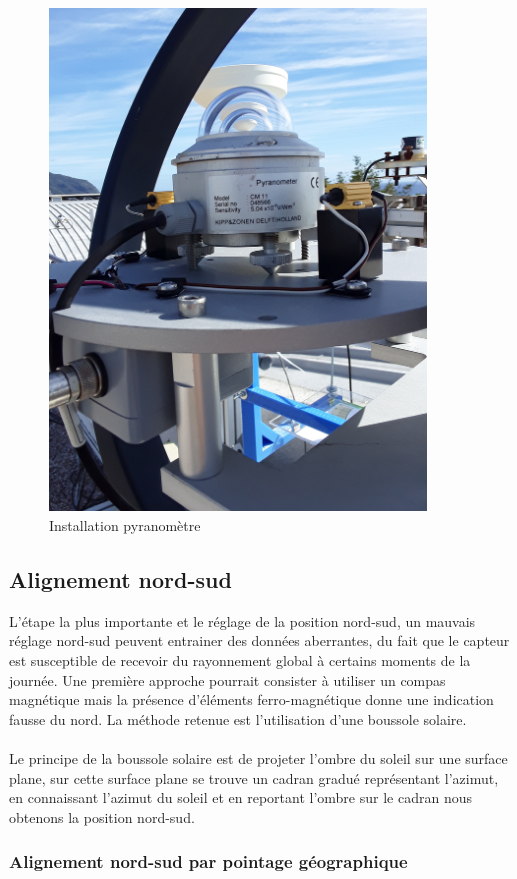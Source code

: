 \documentclass[12pt,a4paper]{article}
\begin{document}
\begin{flushleft}
\begin{figure}[H]
\centering
\includegraphics[width=10cm, angle=-90]{image/montage/4.jpg} 
\caption{Installation pyranomètre}
\end{figure}

\subsection{Alignement nord-sud}
L'étape la plus importante et le réglage de la position nord-sud, un mauvais réglage nord-sud peuvent entrainer des données aberrantes, du fait que le capteur est susceptible de recevoir du rayonnement global à certains moments de la journée. Une première approche pourrait consister à utiliser un compas magnétique mais la présence d'éléments ferro-magnétique donne une indication fausse du nord. La méthode retenue est l'utilisation d'une boussole solaire.\\
~~\\
Le principe de la boussole solaire est de projeter l'ombre du soleil sur une surface plane, sur cette surface plane se trouve un cadran gradué représentant l'azimut, en connaissant l'azimut du soleil et en reportant l'ombre sur le cadran nous obtenons la position nord-sud.\\

\subsubsection{Alignement nord-sud par pointage géographique}


\end{flushleft}
\end{document}
